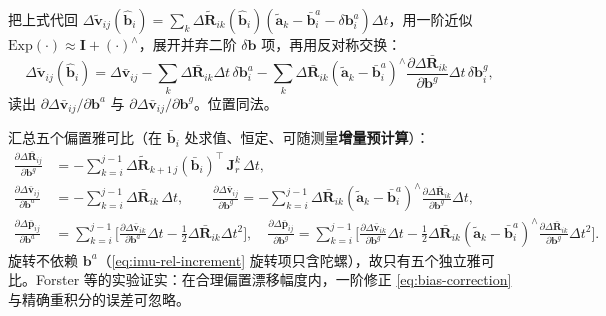 \begin{derivation}[速度偏置雅可比]
把上式代回 $\Delta\tilde{\mathbf v}_{ij}(\hat{\mathbf b}_i)=\sum_k\Delta\tilde{\mathbf R}_{ik}(\hat{\mathbf b}_i)(\tilde{\mathbf a}_k-\bar{\mathbf b}_i^a-\delta\mathbf b_i^a)\Delta t$，用一阶近似 $\mathrm{Exp}(\cdot)\approx\mathbf I+(\cdot)^\wedge$，展开并弃二阶 $\delta\mathbf b$ 项，再用反对称交换：
\[
  \Delta\tilde{\mathbf v}_{ij}(\hat{\mathbf b}_i)=\Delta\bar{\mathbf v}_{ij}-\sum_{k}\Delta\bar{\mathbf R}_{ik}\Delta t\,\delta\mathbf b_i^a-\sum_{k}\Delta\bar{\mathbf R}_{ik}(\tilde{\mathbf a}_k-\bar{\mathbf b}_i^a)^\wedge\frac{\partial\Delta\bar{\mathbf R}_{ik}}{\partial\mathbf b^g}\Delta t\,\delta\mathbf b_i^g,
\]
读出 $\partial\Delta\bar{\mathbf v}_{ij}/\partial\mathbf b^a$ 与 $\partial\Delta\bar{\mathbf v}_{ij}/\partial\mathbf b^g$。位置同法。
\end{derivation}

汇总五个偏置雅可比（在 $\bar{\mathbf b}_i$ 处求值、恒定、可随测量\textbf{增量预计算}）\cite{forster2017preintegration}：
\begin{equation}
  \boxed{\begin{aligned}
    \frac{\partial\Delta\bar{\mathbf R}_{ij}}{\partial\mathbf b^g}&=-\sum_{k=i}^{j-1}\Delta\tilde{\mathbf R}_{k+1\,j}(\bar{\mathbf b}_i)^\top\,\mathbf J_r^k\,\Delta t,\\
    \frac{\partial\Delta\bar{\mathbf v}_{ij}}{\partial\mathbf b^a}&=-\sum_{k=i}^{j-1}\Delta\bar{\mathbf R}_{ik}\,\Delta t,\qquad
    \frac{\partial\Delta\bar{\mathbf v}_{ij}}{\partial\mathbf b^g}=-\sum_{k=i}^{j-1}\Delta\bar{\mathbf R}_{ik}(\tilde{\mathbf a}_k-\bar{\mathbf b}_i^a)^\wedge\frac{\partial\Delta\bar{\mathbf R}_{ik}}{\partial\mathbf b^g}\Delta t,\\
    \frac{\partial\Delta\bar{\mathbf p}_{ij}}{\partial\mathbf b^a}&=\sum_{k=i}^{j-1}\Big[\frac{\partial\Delta\bar{\mathbf v}_{ik}}{\partial\mathbf b^a}\Delta t-\tfrac12\Delta\bar{\mathbf R}_{ik}\Delta t^2\Big],\quad
    \frac{\partial\Delta\bar{\mathbf p}_{ij}}{\partial\mathbf b^g}=\sum_{k=i}^{j-1}\Big[\frac{\partial\Delta\bar{\mathbf v}_{ik}}{\partial\mathbf b^g}\Delta t-\tfrac12\Delta\bar{\mathbf R}_{ik}(\tilde{\mathbf a}_k-\bar{\mathbf b}_i^a)^\wedge\frac{\partial\Delta\bar{\mathbf R}_{ik}}{\partial\mathbf b^g}\Delta t^2\Big].
  \end{aligned}}
  \label{eq:bias-jacobians}
\end{equation}
旋转不依赖 $\mathbf b^a$（\cref{eq:imu-rel-increment} 旋转项只含陀螺），故只有五个独立雅可比。Forster 等的实验证实：在合理偏置漂移幅度内，一阶修正 \cref{eq:bias-correction} 与精确重积分的误差可忽略\cite{forster2017preintegration}。


